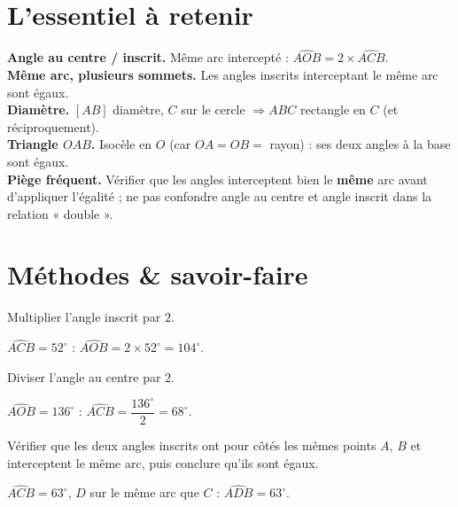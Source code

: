 \section{L'essentiel à retenir}

\begin{synthese}
\textbf{Angle au centre / inscrit.} Même arc intercepté : $\widehat{AOB}=2\times\widehat{ACB}$.\\[4pt]
\textbf{Même arc, plusieurs sommets.} Les angles inscrits interceptant le même arc sont
égaux.\\[4pt]
\textbf{Diamètre.} $[AB]$ diamètre, $C$ sur le cercle $\Rightarrow ABC$ rectangle en $C$
(et réciproquement).\\[4pt]
\textbf{Triangle $OAB$.} Isocèle en $O$ (car $OA=OB=$ rayon) : ses deux angles à la base
sont égaux.\\[4pt]
\textbf{Piège fréquent.} Vérifier que les angles interceptent bien le \textbf{même} arc
avant d'appliquer l'égalité ; ne pas confondre angle au centre et angle inscrit dans la
relation « double ».
\end{synthese}

\section{Méthodes \& savoir-faire}

Multiplier l'angle inscrit par $2$.
\begin{exemple}
$\widehat{ACB}=52^{\circ}$ : $\widehat{AOB}=2\times52^{\circ}=104^{\circ}$.
\end{exemple}

Diviser l'angle au centre par $2$.
\begin{exemple}
$\widehat{AOB}=136^{\circ}$ : $\widehat{ACB}=\dfrac{136^{\circ}}2=68^{\circ}$.
\end{exemple}

Vérifier que les deux angles inscrits ont pour côtés les mêmes points $A$, $B$ et
interceptent le même arc, puis conclure qu'ils sont égaux.
\begin{exemple}
$\widehat{ACB}=63^{\circ}$, $D$ sur le même arc que $C$ : $\widehat{ADB}=63^{\circ}$.
\end{exemple}

